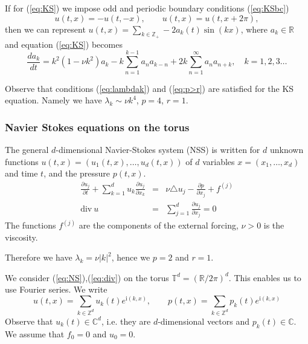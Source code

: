 If for (\ref{eq:KS}) we impose odd and periodic boundary conditions (\ref{eq:KSbc})
 \begin{equation}
u(t,x)=-u(t,-x), \qquad u(t,x) = u(t,x+ 2\pi), \label{eq:KSbc}
\end{equation}
then we can represent  $u(t,x)=\sum_{k \in \mathbb{Z}_+} -2a_k(t) \sin(kx)$,
where $a_k \in \mathbb{R}$ and equation (\ref{eq:KS})
becomes \cite{CCP,ZM}
\begin{equation*}
  \frac{d a_k}{dt}=k^2(1-\nu k^2) a_k - k \sum_{n=1}^{k-1} a_n
  a_{k-n} + 2k \sum_{n=1}^{\infty} a_n  a_{n+k}, \quad k=1,2,3\dots
\end{equation*}



Observe that conditions (\ref{eq:lambdak}) and
(\ref{eq:p>r}) are satisfied for the KS equation. Namely we have
$\lambda_k \sim \nu k^4$, $p=4$, $r=1$.


\subsubsection{Navier Stokes equations on the torus}
 The general $d$-dimensional Navier-Stokes system
(NSS) is written for $d$ unknown functions
$u(t,x)=(u_1(t,x),\dots,u_d(t,x))$ of $d$ variables
$x=(x_1,\dots,x_d)$ and time $t$, and the pressure $p(t,x)$.
\begin{eqnarray}
  \frac{\partial u_j}{\partial t} + \sum_{k=1}^d u_k \frac{\partial u_j}{\partial
  x_k}&=& \nu \triangle u_j - \frac{\partial p}{\partial x_j} +
  f^{(j)} \label{eq:NS} \\
  \mbox{div}\ u&=& \sum_{j=1}^d \frac{\partial u_j}{\partial x_j}=0 \label{eq:div}
\end{eqnarray}
The functions $f^{(j)}$ are the components of the external
forcing, $\nu >0$ is the viscosity.

Therefore we have $\lambda_k = \nu |k|^2$, hence  we $p=2$ and $r=1$.

We consider (\ref{eq:NS}),(\ref{eq:div}) on the torus $\mathbb{T}^d=\left({\mathbb{R}/2\pi}\right)^d$. This enables us to use Fourier
series. We write
\begin{equation}
  u(t,x)=\sum_{k \in \mathbb{Z}^d} u_k(t)e^{\mathrm{i}(k,x)}, \qquad
  p(t,x)=\sum_{k \in \mathbb{Z}^d} p_k(t)e^{\mathrm{i}(k,x)}
\end{equation}
Observe that $u_k(t) \in \mathbb{C}^d$, i.e. they are
$d$-dimensional vectors and $p_k(t) \in \mathbb{C}$. We 
assume that $f_0=0$ and $u_0=0$.


